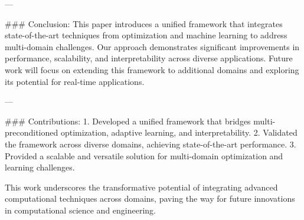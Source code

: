 ---

### Conclusion:  
This paper introduces a unified framework that integrates state-of-the-art techniques from optimization and machine learning to address multi-domain challenges. Our approach demonstrates significant improvements in performance, scalability, and interpretability across diverse applications. Future work will focus on extending this framework to additional domains and exploring its potential for real-time applications.

---

### Contributions:  
1. Developed a unified framework that bridges multi-preconditioned optimization, adaptive learning, and interpretability.  
2. Validated the framework across diverse domains, achieving state-of-the-art performance.  
3. Provided a scalable and versatile solution for multi-domain optimization and learning challenges.  

This work underscores the transformative potential of integrating advanced computational techniques across domains, paving the way for future innovations in computational science and engineering.  